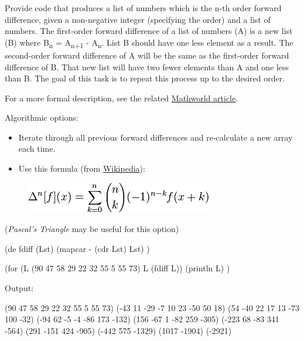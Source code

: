 Provide code that produces a list of numbers which is the n-th order
forward difference, given a non-negative integer (specifying the order)
and a list of numbers. The first-order forward difference of a list of
numbers (A) is a new list (B) where B\textsubscript{n} =
A\textsubscript{n+1} - A\textsubscript{n}. List B should have one less
element as a result. The second-order forward difference of A will be
the same as the first-order forward difference of B. That new list will
have two fewer elements than A and one less than B. The goal of this
task is to repeat this process up to the desired order.

For a more formal description, see the related
\href{http://mathworld.wolfram.com/ForwardDifference.html}{Mathworld
article}.

Algorithmic options:

\begin{itemize}
\item
  Iterate through all previous forward differences and re-calculate a
  new array each time.
\item
  Use this formula (from
  \href{http://en.wikipedia.org/wiki/Forward\_difference}{Wikipedia}):
\end{itemize}

\begin{figure}[H]
\centering
\includegraphics[scale=.6]{graphics/53bd5a42fe34b643a67c4232e71e3f99.png}
\end{figure}

(\emph{Pascal's Triangle} may be useful for this option)



\begin{wideverbatim}

(de fdiff (Lst)
   (mapcar - (cdr Lst) Lst) )

(for (L (90 47 58 29 22 32 55 5 55 73) L (fdiff L))
   (println L) )

Output:

(90 47 58 29 22 32 55 5 55 73)
(-43 11 -29 -7 10 23 -50 50 18)
(54 -40 22 17 13 -73 100 -32)
(-94 62 -5 -4 -86 173 -132)
(156 -67 1 -82 259 -305)
(-223 68 -83 341 -564)
(291 -151 424 -905)
(-442 575 -1329)
(1017 -1904)
(-2921)

\end{wideverbatim}

